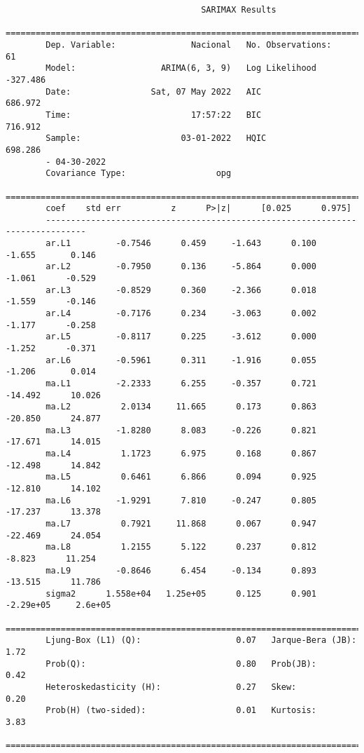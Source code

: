 \documentclass[11pt,letterpaper]{article}
\theoremstyle{definition}
\theoremstyle{theorem}
\theoremstyle{remark}
\begin{document}
 	\begin{verbatim}
 		                               SARIMAX Results                                
 		==============================================================================
 		Dep. Variable:               Nacional   No. Observations:                   61
 		Model:                 ARIMA(6, 3, 9)   Log Likelihood                -327.486
 		Date:                Sat, 07 May 2022   AIC                            686.972
 		Time:                        17:57:22   BIC                            716.912
 		Sample:                    03-01-2022   HQIC                           698.286
 		- 04-30-2022                                         
 		Covariance Type:                  opg                                         
 		==============================================================================
 		coef    std err          z      P>|z|      [0.025      0.975]
 		------------------------------------------------------------------------------
 		ar.L1         -0.7546      0.459     -1.643      0.100      -1.655       0.146
 		ar.L2         -0.7950      0.136     -5.864      0.000      -1.061      -0.529
 		ar.L3         -0.8529      0.360     -2.366      0.018      -1.559      -0.146
 		ar.L4         -0.7176      0.234     -3.063      0.002      -1.177      -0.258
 		ar.L5         -0.8117      0.225     -3.612      0.000      -1.252      -0.371
 		ar.L6         -0.5961      0.311     -1.916      0.055      -1.206       0.014
 		ma.L1         -2.2333      6.255     -0.357      0.721     -14.492      10.026
 		ma.L2          2.0134     11.665      0.173      0.863     -20.850      24.877
 		ma.L3         -1.8280      8.083     -0.226      0.821     -17.671      14.015
 		ma.L4          1.1723      6.975      0.168      0.867     -12.498      14.842
 		ma.L5          0.6461      6.866      0.094      0.925     -12.810      14.102
 		ma.L6         -1.9291      7.810     -0.247      0.805     -17.237      13.378
 		ma.L7          0.7921     11.868      0.067      0.947     -22.469      24.054
 		ma.L8          1.2155      5.122      0.237      0.812      -8.823      11.254
 		ma.L9         -0.8646      6.454     -0.134      0.893     -13.515      11.786
 		sigma2      1.558e+04   1.25e+05      0.125      0.901   -2.29e+05     2.6e+05
 		===================================================================================
 		Ljung-Box (L1) (Q):                   0.07   Jarque-Bera (JB):                 1.72
 		Prob(Q):                              0.80   Prob(JB):                         0.42
 		Heteroskedasticity (H):               0.27   Skew:                             0.20
 		Prob(H) (two-sided):                  0.01   Kurtosis:                         3.83
 		===================================================================================\end{verbatim}
\end{document}
